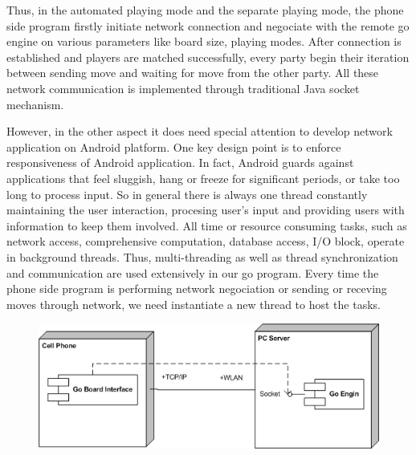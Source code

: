 \documentclass[acmtocl]{acmtrans2m}
\begin{document}
Thus, in the automated playing mode and the separate playing mode, the phone side program firstly initiate network connection and negociate with the remote go engine on various parameters like board size, playing modes. After connection is established and players are matched successfully, every party begin their iteration between sending move and waiting for move from the other party. All these network communication is implemented through traditional Java socket mechanism.

However, in the other aspect it does need special attention to develop network application on Android platform. One key design point is to enforce responsiveness of Android application. In fact, Android guards against applications that feel sluggish, hang or freeze for significant periods, or take too long to process input. So in general there is always one thread constantly maintaining the user interaction, procesing user's input and providing users with information to keep them involved. All time or resource consuming tasks, such as network access, comprehensive computation, database access, I/O block, operate in background threads. Thus, multi-threading as well as thread synchronization and communication are used extensively in our go program. Every time the phone side program is performing network negociation or sending or receving moves through network, we need instantiate a new thread to host the tasks.

\begin{figure}[t]
 \centering
 \includegraphics[width = \linewidth]{fig/deployment}
 \label{fig:deploy}
\end{figure}
\end{document}
